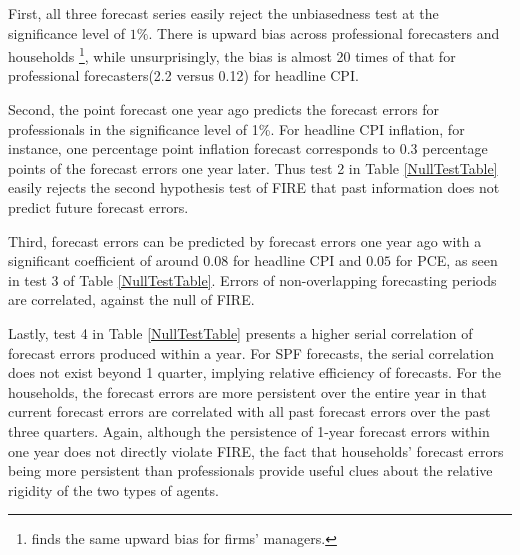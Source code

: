 \documentclass[12pt]{article}
\begin{document}
	First,  all three forecast series easily reject the unbiasedness test at the significance level of $1\%$. There is upward bias across professional forecasters and households \footnote{\citet{coibion2018firms} finds the same upward bias for firms' managers.}, while unsurprisingly, the bias is almost 20 times of that for professional forecasters(2.2 versus 0.12) for headline CPI. 
	
	Second, the point forecast one year ago predicts the forecast errors for professionals in the significance level of 1\%. For headline CPI inflation, for instance, one percentage point inflation forecast corresponds to 0.3 percentage points of the forecast errors one year later. Thus test 2 in Table \ref{NullTestTable} easily rejects the second hypothesis test of FIRE that past information does not predict future forecast errors. 
	
	Third, forecast errors can be predicted by forecast errors one year ago with a significant coefficient of around $0.08$ for headline CPI and $0.05$ for PCE, as seen in test 3 of Table \ref{NullTestTable}. Errors of non-overlapping forecasting periods are correlated, against the null of FIRE. 
	
	Lastly, test 4 in Table \ref{NullTestTable} presents a higher serial correlation of forecast errors produced within a year. For SPF forecasts, the serial correlation does not exist beyond 1 quarter, implying relative efficiency of forecasts. For the households, the forecast errors are more persistent over the entire year in that current forecast errors are correlated with all past forecast errors over the past three quarters.  Again, although the persistence of 1-year forecast errors within one year does not directly violate FIRE, the fact that households' forecast errors being more persistent than professionals provide useful clues about the relative rigidity of the two types of agents. 
	
\end{document}
